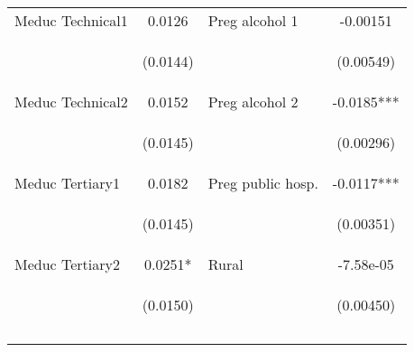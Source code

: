 \begin{table}[htpb!]
\begin{center}
\begin{tabular}{lclc}
Meduc Technical1	&	0.0126	&	Preg alcohol 1	&	-0.00151	\\
	\vspace{4pt} & \begin{footnotesize}	(0.0144)	\end{footnotesize} & \begin{footnotesize}		\end{footnotesize} & \begin{footnotesize}	(0.00549)	\end{footnotesize} \\
Meduc Technical2	&	0.0152	&	Preg alcohol 2	&	-0.0185***	\\
	\vspace{4pt} & \begin{footnotesize}	(0.0145)	\end{footnotesize} & \begin{footnotesize}		\end{footnotesize} & \begin{footnotesize}	(0.00296)	\end{footnotesize} \\
Meduc Tertiary1	&	0.0182	&	Preg public hosp.	&	-0.0117***	\\
	\vspace{4pt} & \begin{footnotesize}	(0.0145)	\end{footnotesize} & \begin{footnotesize}		\end{footnotesize} & \begin{footnotesize}	(0.00351)	\end{footnotesize} \\
Meduc Tertiary2	&	0.0251*	&	Rural	&	-7.58e-05	\\
	\vspace{4pt} & \begin{footnotesize}	(0.0150)	\end{footnotesize} & \begin{footnotesize}		\end{footnotesize} & \begin{footnotesize}	(0.00450)	\end{footnotesize} \\
\vspace{4pt} & \begin{footnotesize}\end{footnotesize} & \begin{footnotesize}\end{footnotesize} & \begin{footnotesize}\end{footnotesize} \\							\\

\end{tabular}
\end{center}
\end{table}
